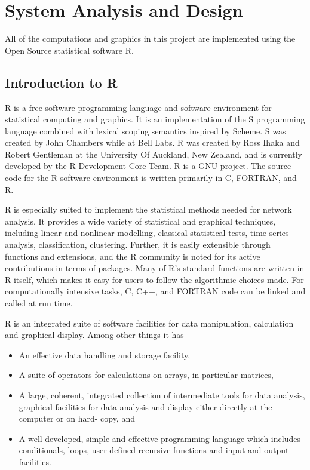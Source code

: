 \chapter{System Analysis and Design}
\ifpdf
    \graphicspath{{Chapter2/Chapter2Figs/PNG/}{Chapter2/Chapter2Figs/PDF/}{Chapter2/Chapter2Figs/}}
\else
    \graphicspath{{Chapter2/Chapter2Figs/EPS/}{Chapter2/Chapter2Figs/}}
\fi


All of the computations and graphics in this project are implemented using the Open Source statistical software R.\cite{R-cite}

\section{Introduction to R}

R is a free software programming language and software environment for statistical computing and graphics.
It is an implementation of the S programming language combined with lexical scoping semantics inspired by Scheme.
S was created by John Chambers while at Bell Labs. R was created by Ross Ihaka and Robert Gentleman
at the University Of Auckland, New Zealand, and is currently developed by the R Development Core Team.
R is a GNU project. The source code for the R software environment is written primarily in C, FORTRAN, and R.

R is especially suited to implement the statistical methods needed for network analysis. It provides a wide
variety of statistical and graphical techniques, including linear and nonlinear modelling, classical statistical tests,
time-series analysis, classification, clustering. Further, it is easily extensible through functions and extensions,
and the R community is noted for its active contributions in terms of packages.
Many of R’s standard functions are written in R itself, which makes it easy for users to follow the algorithmic choices made.
For computationally intensive tasks, C, C++, and FORTRAN code can be linked and called at run time.


R is an integrated suite of software facilities for data manipulation, calculation and graphical display. Among other things it has
\begin{itemize}
\item An effective data handling and storage facility,
\item A suite of operators for calculations on arrays, in particular matrices,
\item A large, coherent, integrated collection of intermediate tools for data analysis, graphical facilities for data analysis and display either directly at the computer or on hard- copy, and
\item A well developed, simple and effective programming language which includes conditionals, loops, user defined recursive functions and input and output facilities.
\end{itemize}

